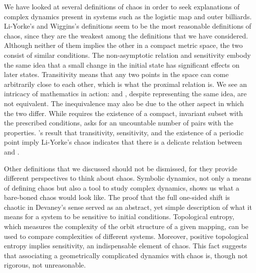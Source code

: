 \documentclass[10pt,twoside,draft]{book}
\begin{document}
We have looked at several definitions of chaos in order to seek explanations of complex dynamics present in systems such as the logistic map and outer billiards.
Li-Yorke's and Wiggins's definitions seem to be the most reasonable definitions of chaos, since they are the weakest among the definitions that we have considered.
Although neither of them implies the other in a compact metric space, the two consist of similar conditions.
The non-asymptotic relation and sensitivity embody the same idea that a small change in the initial state has significant effects on later states.
Transitivity means that any two points in the space can come arbitrarily close to each other, which is what the proximal relation is.
We see an intricacy of mathematics in action: \wig and \liy, despite representing the same idea, are not equivalent.
The inequivalence may also be due to the other aspect in which the two differ.
While \wig requires the existence of a compact, invariant subset with the prescribed conditions, \liy asks for an uncountable number of pairs with the properties. 
\citet{mai}'s result that transitivity, sensitivity, and the existence of a periodic point imply Li-Yorke's chaos indicates that there is a delicate relation between \liy and \wig.


Other definitions that we discussed should not be dismissed, for they provide different perspectives to think about chaos.
Symbolic dynamics, not only a means of defining chaos but also a tool to study complex dynamics, shows us what a bare-boned chaos would look like.
The proof that the full one-sided shift is chaotic in Devaney's sense served as an abstract, yet simple description of what it means for a system to be sensitive to initial conditions.
Topological entropy, which measures the complexity of the orbit structure of a given mapping, can be used to compare complexities of different systems.
Moreover, positive topological entropy implies sensitivity, an indispensable element of chaos.
This fact suggests that associating a geometrically complicated dynamics with chaos is, though not rigorous, not unreasonable.
\end{document}
